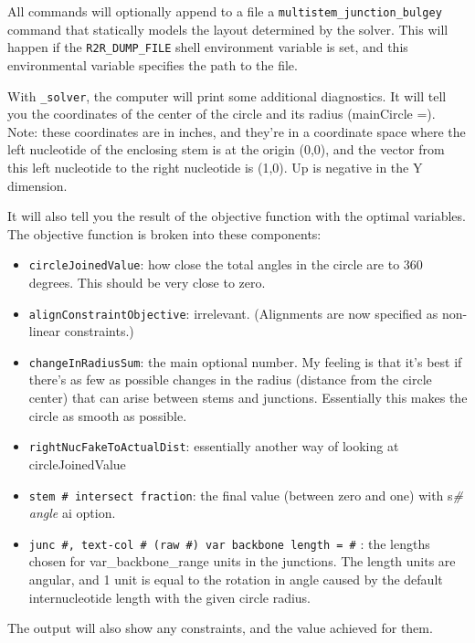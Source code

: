 \documentclass[letterpaper,12pt]{report}
\begin{document}
All commands will optionally append to a file  a {\tt multistem\_junction\_bulgey} command that statically models the layout determined by the solver.  This will happen if the {\tt R2R\_DUMP\_FILE} shell environment variable is set, and this environmental variable specifies the path to the file.

With {\tt \_solver}, the computer will print some additional diagnostics.  It
will tell you the coordinates of the center of the circle and its
radius (mainCircle =).  Note: these coordinates are in inches, and
they{\textquoteright}re in a coordinate space where the left nucleotide
of the enclosing stem is at the origin (0,0), and the vector from this
left nucleotide to the right nucleotide is (1,0).  Up is negative in
the Y dimension.

It will also tell you the result of the objective function with the
optimal variables.  The objective function is broken into these
components:

\begin{itemize}
\item {\tt circleJoinedValue}: how close the total angles in the circle are to
360 degrees.  This should be very close to zero.
\item {\tt alignConstraintObjective}: irrelevant.  (Alignments are now specified as non-linear constraints.)
\item {\tt changeInRadiusSum}: the main optional number.  My feeling is that
it{\textquoteright}s best if there{\textquoteright}s as few as possible
changes in the radius (distance from the circle center) that can arise
between stems and junctions.  Essentially this makes the circle as
smooth as possible.
\item {\tt rightNucFakeToActualDist}: essentially another way of looking at
circleJoinedValue
\item {\tt stem \# intersect fraction}: the final value (between zero and one)
with s\textit{\#} \textit{angle} ai option.
\item {\tt junc \#, text-col \# (raw \#) var backbone length = \#} : the
lengths chosen for var\_backbone\_range units in the junctions.  The
length units are angular, and 1 unit is equal to the rotation in angle
caused by the default internucleotide length with the given circle
radius.
\end{itemize}

The output will also show any constraints, and the value achieved for them.
\end{document}
